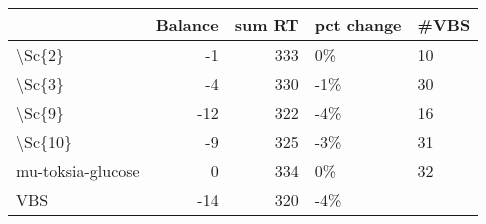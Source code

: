 \begin{tabular}{lrrll}
\toprule
{} &  Balance &  sum RT & pct change & \#VBS \\
\midrule
\textbackslash Sc\{2\}            &       -1 &     333 &         0\% &   10 \\
\textbackslash Sc\{3\}            &       -4 &     330 &        -1\% &   30 \\
\textbackslash Sc\{9\}            &      -12 &     322 &        -4\% &   16 \\
\textbackslash Sc\{10\}           &       -9 &     325 &        -3\% &   31 \\
mu-toksia-glucose &        0 &     334 &         0\% &   32 \\
VBS               &      -14 &     320 &        -4\% &      \\
\bottomrule
\end{tabular}
